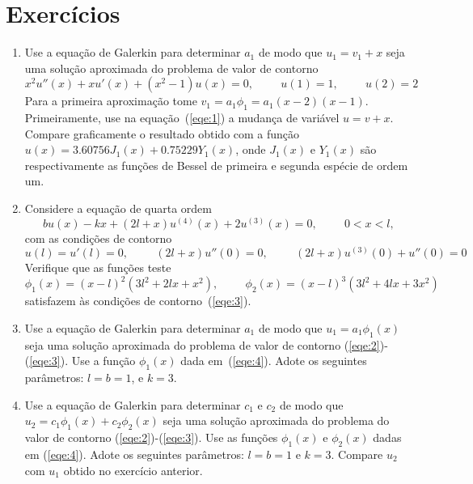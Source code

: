 \documentclass[10pt,a4paper]{article}
\begin{document}
	\section{Exercícios}
	\begin{enumerate}
		\item Use a equação de Galerkin para determinar $a_1$ de modo que $u_1=v_1+x$ seja uma solução aproximada do problema de valor de contorno
	\begin{equation}
		x^2u''(x) + xu'(x)+(x^2-1)u(x)=0, \hspace{1cm} u(1)=1, \hspace{1cm} u(2)=2
		\label{eqe:1}
	\end{equation}
	Para a primeira aproximação tome $v_1=a_1\phi_1=a_1(x-2)(x-1)$. Primeiramente, use na equação~(\ref{eqe:1}) a mudança de variável $u=v+x$. Compare graficamente o resultado obtido com a função $u(x)=3.60756J_1(x)+0.75229Y_1(x)$, onde $J_1(x)$ e $Y_1(x)$ são respectivamente as funções de Bessel de primeira e segunda espécie de ordem um.
	
		\item Considere a equação de quarta ordem
	\begin{equation}
		bu(x)-kx+(2l+x)u^{(4)}(x)+2u^{(3)}(x) = 0, \hspace{1cm}0<x<l,
		\label{eqe:2}
	\end{equation}
	com as condições de contorno
	\begin{equation}
		u(l) = u'(l)=0,\hspace{1cm} (2l+x)u''(0)=0, \hspace{1cm} (2l+x)u^{(3)}(0)+u''(0)=0
		\label{eqe:3}
	\end{equation}
	Verifique que as funções teste
	\begin{equation}
		\phi_1(x) = (x-l)^2(3l^2+2lx+x^2), \hspace{1cm} \phi_2(x)=(x-l)^3(3l^2+4lx+3x^2)
		\label{eqe:4}
	\end{equation}
	satisfazem às condições de contorno~(\ref{eqe:3}).
	
		\item Use a equação de Galerkin para determinar $a_1$ de modo que $u_1=a_1\phi_1(x)$ seja uma solução aproximada do problema de valor de contorno (\ref{eqe:2})-(\ref{eqe:3}). Use a função $\phi_1(x)$ dada em~(\ref{eqe:4}). Adote os seguintes parâmetros: $l=b=1$, e $k=3$.
	
		\item Use a equação de Galerkin para determinar $c_1$ e $c_2$ de modo que $u_2=c_1\phi_1(x)+c_2\phi_2(x)$ seja uma solução aproximada do problema do valor de contorno (\ref{eqe:2})-(\ref{eqe:3}). Use as funções $\phi_1(x)$ e $\phi_2(x)$ dadas em (\ref{eqe:4}). Adote os seguintes parâmetros: $l=b=1$ e $k=3$. Compare $u_2$ com $u_1$ obtido no exercício anterior.
	\end{enumerate}
	
\end{document}
